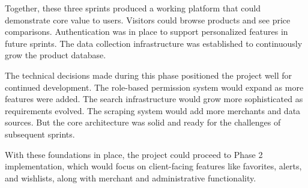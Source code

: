 Together, these three sprints produced a working platform that
could demonstrate core value to users. Visitors could browse
products and see price comparisons. Authentication was in place
to support personalized features in future sprints. The data
collection infrastructure was established to continuously grow
the product database.

The technical decisions made during this phase positioned the
project well for continued development. The role-based permission
system would expand as more features were added. The search
infrastructure would grow more sophisticated as requirements
evolved. The scraping system would add more merchants and data
sources. But the core architecture was solid and ready for the
challenges of subsequent sprints.

With these foundations in place, the project could proceed to
Phase 2 implementation, which would focus on client-facing
features like favorites, alerts, and wishlists, along with
merchant and administrative functionality.